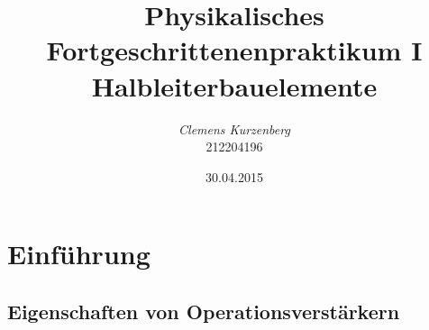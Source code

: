 \documentclass[10pt,a4paper]{scrartcl}
\title {Physikalisches Fortgeschrittenenpraktikum I\linebreak
Halbleiterbauelemente}
\author {\emph{Clemens Kurzenberg}\\212204196}
\date {30.04.2015}
\begin{document}
\maketitle

\begin{abstract}
\end{abstract}

\tableofcontents

\pagebreak
\listoffigures
\listoftables

\pagebreak
\section {Einführung}

\subsection {Eigenschaften von Operationsverstärkern}
\end{document}
